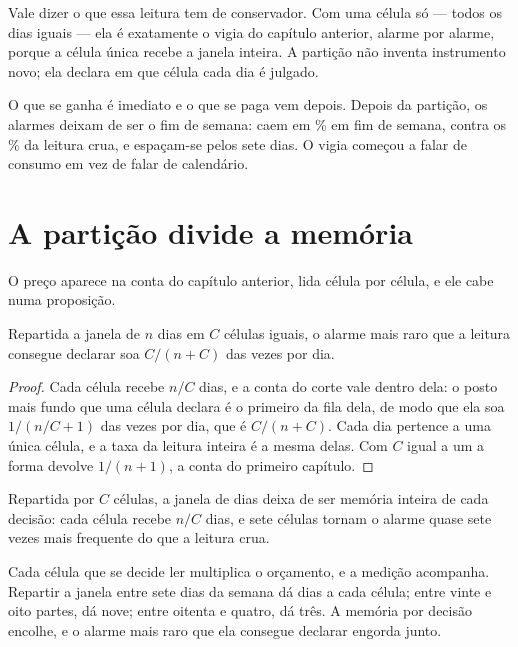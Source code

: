 Vale dizer o que essa leitura tem de conservador. Com uma célula só --- todos os dias iguais
--- ela é exatamente o vigia do capítulo anterior, alarme por alarme, porque a célula única
recebe a janela inteira. A partição não inventa instrumento novo; ela declara em que célula
cada dia é julgado.

O que se ganha é imediato e o que se paga vem depois. Depois da partição, os alarmes deixam de
ser o fim de semana: caem em \numCalendarioSemanaFimDeSemanaPct\% em fim de semana, contra os
\numCalendarioCruFimDeSemanaPct\% da leitura crua, e espaçam-se pelos sete dias. O vigia
começou a falar de consumo em vez de falar de calendário.

\section{A partição divide a memória}

O preço aparece na conta do capítulo anterior, lida célula por célula, e ele cabe numa
proposição.

\begin{proposicao}\label{prop:particao}
Repartida a janela de $n$ dias em $C$ células iguais, o alarme mais raro que a leitura consegue
declarar soa $C/(n+C)$ das vezes por dia.
\end{proposicao}

\begin{proof}
Cada célula recebe $n/C$ dias, e a conta do corte vale dentro dela: o posto mais fundo que uma
célula declara é o primeiro da fila dela, de modo que ela soa $1/(n/C + 1)$ das vezes por dia, que
é $C/(n+C)$. Cada dia pertence a uma única célula, e a taxa da leitura inteira é a mesma delas.
Com $C$ igual a um a forma devolve $1/(n+1)$, a conta do primeiro capítulo.
\end{proof}

Repartida por $C$ células, a janela de \numCalendarioJanela{} dias deixa de ser memória inteira de
cada decisão: cada célula recebe $n/C$ dias, e sete células tornam o alarme quase sete vezes mais
frequente do que a leitura crua.

Cada célula que se decide ler multiplica o orçamento, e a medição acompanha. Repartir a janela
entre sete dias da semana dá 
\numCalendarioSemanaDiasPorCelula{} dias a cada célula; entre vinte
e oito partes, dá nove; entre oitenta e quatro, dá três. A memória por decisão encolhe, e o
alarme mais raro que ela consegue declarar engorda junto.

